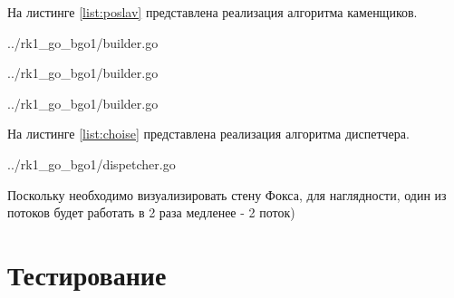 На листинге \ref{list:poslav} представлена реализация алгоритма каменщиков.

\begin{lstinputlisting}
    [caption = {Реализация алгоритма каменщика ч. 1},
    label = {list:poslav},
    linerange={89-98},
    ]{../rk1_go_bgo1/builder.go}
\end{lstinputlisting}
\begin{lstinputlisting}
    [caption = {Реализация алгоритма каменщика ч. 2},
    label = {list:poslav},
    linerange={98-129},
    ]{../rk1_go_bgo1/builder.go}
\end{lstinputlisting}
\begin{lstinputlisting}
    [caption = {Реализация алгоритма каменщика ч. 3},
    label = {list:poslav},
    linerange={129-133},
    ]{../rk1_go_bgo1/builder.go}
\end{lstinputlisting}


На листинге \ref{list:choise} представлена реализация алгоритма диспетчера.

\begin{lstinputlisting}
    [caption = {Реализация алгоритма диспетчера},
    label = {list:choise},
    linerange={121-145},
    ]{../rk1_go_bgo1/dispetcher.go}
\end{lstinputlisting}

Поскольку необходимо визуализировать стену Фокса, для наглядности, один из потоков будет работать в 2 раза медленее - 2 поток)

\section{Тестирование}\label{TestResult}






